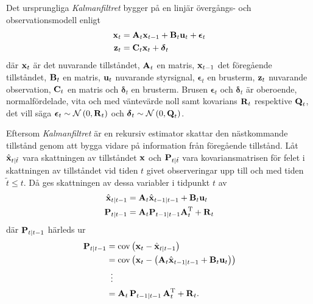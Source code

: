 \documentclass[11pt]{article}
\newcommand{\bfr}[1]{\textbf{\textrm{{#1}}}}
\begin{document}
\begin{flushleft}
Det ursprungliga \emph{Kalmanfiltret} bygger på en linjär övergångs- och observationsmodell enligt
\begin{align*}
	\bfr{x}_t &= \bfr{A}_{t}\bfr{x}_{t-1} + \bfr{B}_{t}\bfr{u}_t + \boldsymbol{\epsilon}_t \\
	\bfr{z}_t &= \bfr{C}_{t}\bfr{x}_t + \boldsymbol{\delta}_t
\end{align*}
där $\bfr{x}_t$ är det nuvarande tillståndet, $\bfr{A}_t$ en matris, $\bfr{x}_{t-1}$ det föregående tillståndet, $\bfr{B}_t$ en matris, $\bfr{u}_t$ nuvarande styrsignal, $\boldsymbol{\epsilon}_t$ en brusterm, $\bfr{z}_t$ nuvarande observation, $\bfr{C}_t$ en matris och $\boldsymbol{\delta}_t$ en brusterm. Brusen $\boldsymbol{\epsilon}_t$ och $\boldsymbol{\delta}_t$ är oberoende, normalfördelade, vita och  med väntevärde noll samt kovarians $\bfr{R}_t$ respektive $\bfr{Q}_t$, det vill säga $\boldsymbol{\epsilon}_t \sim \mathcal{N}\left(0,\bfr{R}_t\right)$ och $\boldsymbol{\delta}_t \sim \mathcal{N}\left(0,\bfr{Q}_t\right)$.

Eftersom \emph{Kalmanfiltret} är en rekursiv estimator skattar den nästkommande tillstånd genom att bygga vidare på information från föregående tillstånd. Låt $\hat{\bfr{x}}_{t\vert \tilde{t}}$ vara skattningen av tillståndet $\bfr{x}$ och $\bfr{P}_{t\vert \tilde{t}}$ vara kovariansmatrisen för felet i skattningen av tillståndet vid tiden $t$ givet observeringar upp till och med tiden $\tilde{t}\leq t$. Då ges skattningen av dessa variabler i tidpunkt $t$ av
\begin{align*}
	\hat{\bfr{x}}_{t\vert t-1} &= \bfr{A}_{t}\hat{\bfr{x}}_{t-1\vert t-1} + \bfr{B}_{t}\bfr{u}_{t} \\
	\bfr{P}_{t\vert t-1} & = \bfr{A}_{t}\bfr{P}_{t-1\vert t-1}\bfr{A}_{t}^{\mathrm{T}} + \bfr{R}_t
\end{align*}
där $\bfr{P}_{t\vert t-1}$ härleds ur
\begin{align*}
	\bfr{P}_{t\vert t-1} &= \mathrm{cov}\left(\bfr{x}_{t}-\hat{\bfr{x}}_{t\vert t-1}\right) \\
	&= \mathrm{cov}\left(\bfr{x}_{t}-\left(\bfr{A}_{t}\hat{\bfr{x}}_{t-1\vert t-1} + \bfr{B}_{t}\bfr{u}_{t}\right)\right) \\
	&\hspace{.5em}\vdots \\
	&= \bfr{A}_{t}\,\bfr{P}_{t-1\vert t-1}\,\bfr{A}_{t}^{\mathrm{T}} + \bfr{R}_{t}.
\end{align*}


\end{flushleft}
\end{document}
